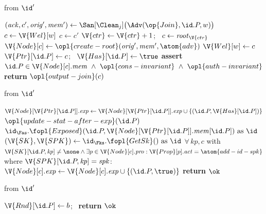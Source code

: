 \begin{interface}
{ \quad from $\id'$
\begin{algorithmic}[1]
\algcont
\State $(\mathit{ack}, c', \mathit{orig}', \mathit{mem}') \gets \San[\Clean_{j}]\bigl(\Adv(\op{Join}, \id.P, w)\bigr)$
\State $c \gets \V{Wel}[w]$
  \State $c \gets c'$
\EndIf
{} \label{ln:cgkaneworphan}
  \State $\V{ctr} \gets \V{ctr} + 1$; \ $c \gets \mathit{root}_{\V{ctr}}$
  \State $\V{Node}[c] \gets \opl{create-root}(\mathit{orig}', \mathit{mem}', \atom{adv})$ \label{ln:cgkafakegroup}
\EndIf
{}
  \State $\V{Wel}[w] \gets c$
\EndIf
\State $\V{Ptr}[\id.P] \gets c$; \ $\V{Has}[\id.P] \gets \true$
\State \textbf{assert}\ $\id.P \in \V{Node}[c].\mathit{mem} \ \wedge\ \opl{cons-invariant} \ \wedge\ \opl{auth-invariant}$
\State \textbf{return} $\opl{output-join}(c)$
\algsave
\end{algorithmic}
\vspace{1.4ex}

 \quad from $\id'$
\begin{algorithmic}[1]
\algcont
{}
  \State $\V{Node}[\V{Ptr}[\id.P]].\mathit{exp} \gets \V{Node}[\V{Ptr}[\id.P]].\mathit{exp} \cup \{(\id.P, \V{Has}[\id.P])\}$
  \State $\opl{update-stat-after-exp}(\id.P)$
  \State $\id_{\Fas}.\fopl{Exposed}(\id.P, \V{Node}[\V{Ptr}[\id.P]].\mathit{mem}[\id.P]) \text{ as } \id$
\EndIf
\State $(\V{SK}, \V{SPK}) \gets \id_{\Fks}.\fopl{GetSk}() \text{ as } \id$ \label{ln:cgkaks}
\State $\forall\, \mathit{kp}, c$ with $\V{SK}[\id.P, \mathit{kp}] \neq \none \wedge \exists p \in \V{Node}[c].\mathit{pro} : \V{Prop}[p].\mathit{act} = \atom{add-id-spk}$
\State \quad where $\V{SPK}[\id.P, \mathit{kp}] = \mathit{spk}$: \ $\V{Node}[c].\mathit{exp} \gets \V{Node}[c].\mathit{exp} \cup \{(\id.P, \true)\}$ \label{ln:cgkawelcomekeys}
 \label{ln:cgkadisallowed}
\State \textbf{return} $\ok$
\algsave
\end{algorithmic}
\vspace{1.4ex}

 \quad from $\id'$
\begin{algorithmic}[1]
\algcont
{} \label{ln:cgkacorrrand}
\State $\V{Rnd}[\id.P] \gets b$; \ \textbf{return} $\ok$
\algsave
\end{algorithmic}}
\end{interface}
